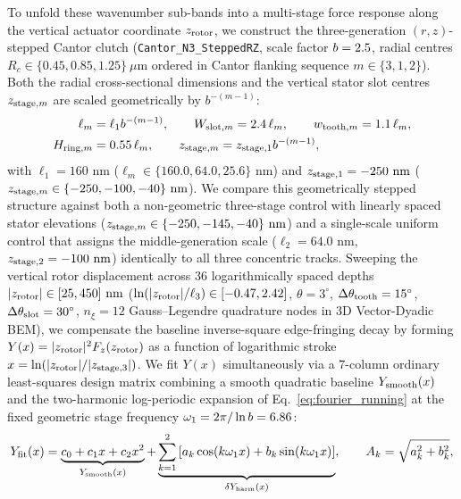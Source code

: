 \documentclass[pdflatex,sn-nature]{sn-jnl}
\DeclareRobustCommand{\roundtwo}[1]{\fpeval{round(#1,2)}}
\begin{document}
To unfold these wavenumber sub-bands into a multi-stage force response along the vertical actuator coordinate $z_{\rm rotor}$, we construct the three-generation $(r,z)$-stepped Cantor clutch (\texttt{Cantor\_N3\_SteppedRZ}, scale factor $b = 2.5{}$, radial centres $R_c \in \{0.45, 0.85, 1.25\}\ \mu\text{m}$ ordered in Cantor flanking sequence $m \in \{3, 1, 2\}$). Both the radial cross-sectional dimensions and the vertical stator slot centres $z_{{\rm stage},m}$ are scaled geometrically by $b^{-(m-1)}$:
\begin{equation}
\begin{aligned}
\ell_m &= \ell_1 b^{-(m-1)}, \qquad
W_{{\rm slot},m} = 2.4\,\ell_m, \qquad
w_{{\rm tooth},m} = 1.1\,\ell_m, \\
H_{{\rm ring},m} &= 0.55\,\ell_m, \qquad
z_{{\rm stage},m} = z_{{\rm stage},1} b^{-(m-1)},
\end{aligned}
\label{eq:methods_stepped_rz}
\end{equation}
with $\ell_1 = 160\text{ nm}$ ($\ell_m \in \{160.0, 64.0, 25.6\}\text{ nm}$) and $z_{{\rm stage},1} = -250\text{ nm}$ ($z_{{\rm stage},m} \in \{-250, -100, -40\}\text{ nm}$). We compare this geometrically stepped structure against both a non-geometric three-stage control with linearly spaced stator elevations ($z_{{\rm stage},m} \in \{-250, -145, -40\}\text{ nm}$) and a single-scale uniform control that assigns the middle-generation scale ($\ell_2 = 64.0\text{ nm}$, $z_{{\rm stage},2} = -100\text{ nm}$) identically to all three concentric tracks. Sweeping the vertical rotor displacement across $36$ logarithmically spaced depths $|z_{\rm rotor}| \in [25, 450]\text{ nm}$ ($\ln(|z_{\rm rotor}|/\ell_3) \in [-0.47, 2.42]$, $\theta = 3^\circ$, $\Delta\theta_{\rm tooth} = 15^\circ$, $\Delta\theta_{\rm slot} = 30^\circ$, $n_\xi = 12$ Gauss--Legendre quadrature nodes in 3D Vector-Dyadic BEM), we compensate the baseline inverse-square edge-fringing decay by forming $Y(x) = |z_{\rm rotor}|^2 F_z(z_{\rm rotor})$ as a function of logarithmic stroke $x = \ln(|z_{\rm rotor}| / |z_{{\rm stage},3}|)$. We fit $Y(x)$ simultaneously via a $7$-column ordinary least-squares design matrix combining a smooth quadratic baseline $Y_{\rm smooth}(x)$ and the two-harmonic log-periodic expansion of Eq.~\eqref{eq:fourier_running} at the fixed geometric stage frequency $\omega_1 = 2\pi / \ln b = \roundtwo{\LogperSteppedRzOmegaone}$:
\begin{equation}
Y_{\rm fit}(x) = \underbrace{c_0 + c_1 x + c_2 x^2}_{Y_{\rm smooth}(x)} + \underbrace{\sum_{k=1}^{2} \left[ a_k \cos(k \omega_1 x) + b_k \sin(k \omega_1 x) \right]}_{\delta Y_{\rm harm}(x)}, \qquad A_k = \sqrt{a_k^2 + b_k^2},
\label{eq:methods_logper_fit}
\end{equation}
\end{document}
